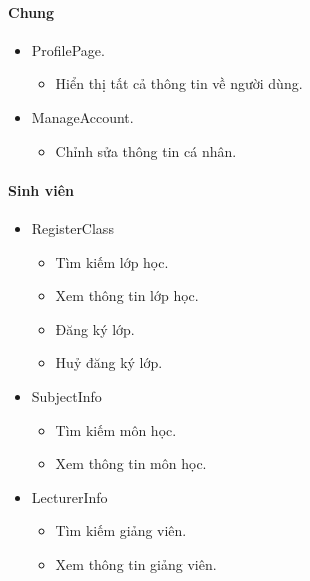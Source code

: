 \documentclass[12pt]{book}
\begin{document}
      \paragraph{Chung}
      \begin{itemize}
        \item ProfilePage.
        \begin{itemize}
          \item Hiển thị tất cả thông tin về người dùng.
        \end{itemize}
        \item ManageAccount.
        \begin{itemize}
          \item Chỉnh sửa thông tin cá nhân.
        \end{itemize}
      \end{itemize}

      \paragraph{Sinh viên}
      \begin{itemize}
        \item RegisterClass
        \begin{itemize}
          \item Tìm kiếm lớp học.
          \item Xem thông tin lớp học.
          \item Đăng ký lớp.
          \item Huỷ đăng ký lớp.
        \end{itemize}
        \item SubjectInfo
        \begin{itemize}
          \item Tìm kiếm môn học.
          \item Xem thông tin môn học.
        \end{itemize}
        \item LecturerInfo
        \begin{itemize}
          \item Tìm kiếm giảng viên.
          \item Xem thông tin giảng viên.
        \end{itemize}
      \end{itemize}
\end{document}
